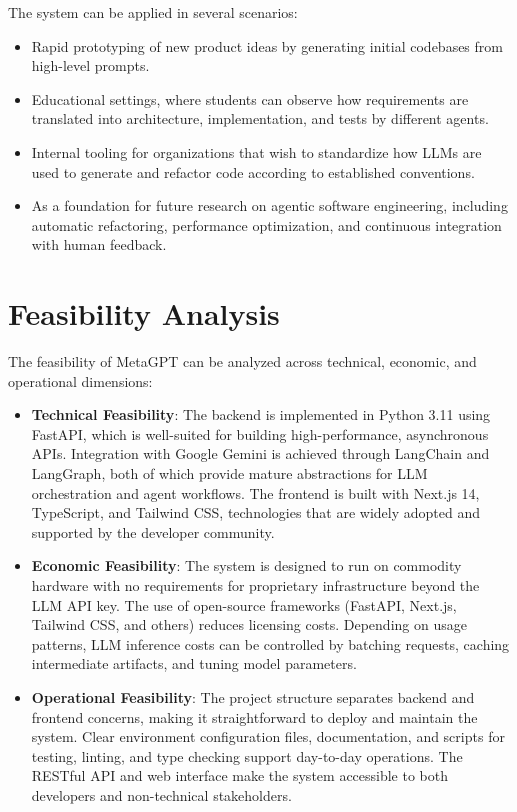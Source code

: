 The system can be applied in several scenarios:
\begin{itemize}
    \item Rapid prototyping of new product ideas by generating initial codebases from high-level prompts.
    \item Educational settings, where students can observe how requirements are translated into architecture, implementation, and tests by different agents.
    \item Internal tooling for organizations that wish to standardize how LLMs are used to generate and refactor code according to established conventions.
    \item As a foundation for future research on agentic software engineering, including automatic refactoring, performance optimization, and continuous integration with human feedback.
\end{itemize}

\section{Feasibility Analysis}

The feasibility of MetaGPT can be analyzed across technical, economic, and operational dimensions:
\begin{itemize}
    \item \textbf{Technical Feasibility}: The backend is implemented in Python 3.11 using FastAPI, which is well-suited for building high-performance, asynchronous APIs. Integration with Google Gemini is achieved through LangChain and LangGraph, both of which provide mature abstractions for LLM orchestration and agent workflows. The frontend is built with Next.js 14, TypeScript, and Tailwind CSS, technologies that are widely adopted and supported by the developer community.
    \item \textbf{Economic Feasibility}: The system is designed to run on commodity hardware with no requirements for proprietary infrastructure beyond the LLM API key. The use of open-source frameworks (FastAPI, Next.js, Tailwind CSS, and others) reduces licensing costs. Depending on usage patterns, LLM inference costs can be controlled by batching requests, caching intermediate artifacts, and tuning model parameters.
    \item \textbf{Operational Feasibility}: The project structure separates backend and frontend concerns, making it straightforward to deploy and maintain the system. Clear environment configuration files, documentation, and scripts for testing, linting, and type checking support day-to-day operations. The RESTful API and web interface make the system accessible to both developers and non-technical stakeholders.
\end{itemize}

